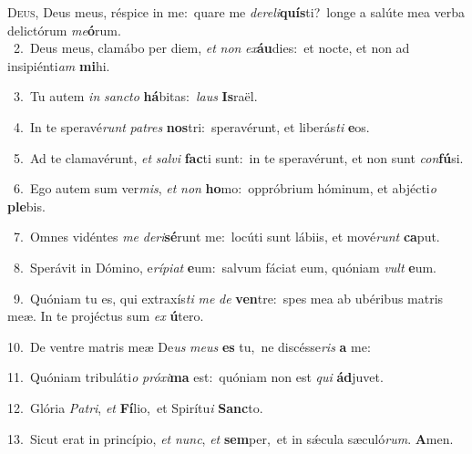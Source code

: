 \lettrine{\initial\textcolor{\initialcolor}{D}}{eus,} Deus meus, réspice in me:~\dagger quare me \textit{de}\-\textit{re}\textit{li}\textbf{quís}ti?~\star longe a salúte mea verba delictórum \textit{me}\-\textbf{ó}rum.\\
{\numbfont\textcolor{\numbcolor}{~2.}}~Deus meus, clamábo per diem, \textit{et} \textit{non} \textit{ex}\-\textbf{áu}dies:~\star et nocte, et non ad insipiénti\textit{am} \textbf{mi}\-hi.\par
{\numbfont\textcolor{\numbcolor}{~3.}}~Tu autem \textit{in} \textit{sanc}\-\textit{to} \textbf{há}\-bitas:~\star \textit{laus} \textbf{Is}\-raël.\par
{\numbfont\textcolor{\numbcolor}{~4.}}~In te speravé\textit{runt} \textit{pa}\-\textit{tres} \textbf{nos}\-tri:~\star speravérunt, et liberás\textit{ti} \textbf{e}\-os.\par
{\numbfont\textcolor{\numbcolor}{~5.}}~Ad te clamavérunt, \textit{et} \textit{sal}\-\textit{vi} \textbf{fac}\-ti sunt:~\star in te speravérunt, et non sunt \textit{con}\-\textbf{fú}si.\par
{\numbfont\textcolor{\numbcolor}{~6.}}~Ego autem sum ver\-\textit{mis}\-, \textit{et} \textit{non} \textbf{ho}\-mo:~\star oppróbrium hóminum, et abjécti\textit{o} \textbf{ple}\-bis.\par
{\numbfont\textcolor{\numbcolor}{~7.}}~Omnes vidéntes \textit{me} \textit{de}\-\textit{ri}\textbf{sé}runt me:~\star locúti sunt lábiis, et mové\textit{runt} \textbf{ca}\-put.\par
{\numbfont\textcolor{\numbcolor}{~8.}}~Sperávit in Dómino, e\-\textit{rí}\-\textit{pi}\textit{at} \textbf{e}\-um:~\star salvum fáciat eum, quóniam \textit{vult} \textbf{e}\-um.\par
{\numbfont\textcolor{\numbcolor}{~9.}}~Quóniam tu es, qui extraxís\textit{ti} \textit{me} \textit{de} \textbf{ven}\-tre:~\star spes mea ab ubéribus matris meæ. In te projéctus sum \textit{ex} \textbf{ú}\-tero.\par
{\numbfont\textcolor{\numbcolor}{10.}}~De ventre matris meæ De\textit{us} \textit{me}\-\textit{us} \textbf{es} tu,~\star ne discésse\textit{ris} \textbf{a} me:\par
{\numbfont\textcolor{\numbcolor}{11.}}~Quóniam tribuláti\textit{o} \textit{pró}\-\textit{xi}\textbf{ma} est:~\star quóniam non est \textit{qui} \textbf{ád}\-juvet.\par
{\numbfont\textcolor{\numbcolor}{12.}}~Glória \textit{Pa}\-\textit{tri}, \textit{et} \textbf{Fí}\-lio,~\star et Spirítu\textit{i} \textbf{Sanc}\-to.\par
{\numbfont\textcolor{\numbcolor}{13.}}~Sicut erat in princípio, \textit{et} \textit{nunc}\-, \textit{et} \textbf{sem}\-per,~\star et in sǽcula sæculó\-\textit{rum}\-. \textbf{A}\-men.\par
